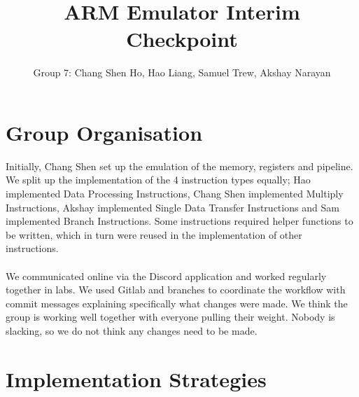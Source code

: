 \documentclass[11pt]{article}
\begin{document}
\title{ARM  Emulator Interim Checkpoint}
\author{Group 7: Chang Shen Ho, Hao Liang, Samuel Trew, Akshay Narayan}

\maketitle	

\section{Group Organisation}

Initially, Chang Shen set up the emulation of the memory, registers and pipeline. We split up the implementation of the 4 instruction types equally; Hao implemented Data Processing Instructions, Chang Shen implemented Multiply Instructions, Akshay implemented Single Data Transfer Instructions and Sam implemented Branch Instructions. Some instructions required helper functions to be written, which in turn were reused in the implementation of other instructions.
\\ \\
We communicated online via the Discord application and worked regularly together in labs. We used Gitlab and branches to coordinate the workflow with commit messages explaining specifically what changes were made. We think the group is working well together with everyone pulling their weight. Nobody is slacking, so we do not think any changes need to be made.

\section{Implementation Strategies}
\end{document}
